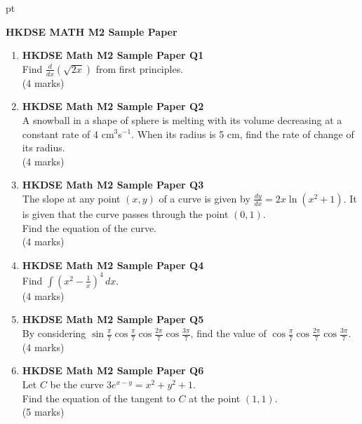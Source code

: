 \documentclass[12pt]{article}
\begin{document}
 pt
\begin{center}
	{\large \bf HKDSE MATH M2 Sample Paper}\\
	\vspace{2 mm}

\end{center}
\vspace{0.05cm}

\begin{enumerate}
	\item \textbf{HKDSE Math M2 Sample Paper Q1}\\
	Find $\displaystyle\frac{d}{dx}(\sqrt{2x})$ from first principles. \\(4 marks)


	\item \textbf{HKDSE Math M2 Sample Paper Q2}\\
	A snowball in a shape of sphere is melting with its volume decreasing at a constant rate of 4 cm$^3$s$^{-1}$. When its radius is 5 cm, find the rate of change of its radius. \\(4 marks)


	\item \textbf{HKDSE Math M2 Sample Paper Q3}\\
	The slope at any point $(x,y)$ of a curve is given by $\displaystyle\frac{dy}{dx} = 2x \ln{(x^2+1)}$. It is given that the curve passes through the point $(0,1)$.\\Find the equation of the curve. \\(4 marks)
		

	\item \textbf{HKDSE Math M2 Sample Paper Q4}\\
	Find $\displaystyle\int\left(x^2-\frac{1}{x}\right)^4 \,dx$. \\(4 marks)


	\item \textbf{HKDSE Math M2 Sample Paper Q5}\\
	By considering $\displaystyle\sin{\frac{\pi}{7}}\cos{\frac{\pi}{7}}\cos{\frac{2\pi}{7}}\cos{\frac{3\pi}{7}}$, find the value of $\displaystyle\cos{\frac{\pi}{7}}\cos{\frac{2\pi}{7}}\cos{\frac{3\pi}{7}}$. \\(4 marks)


	\item \textbf{HKDSE Math M2 Sample Paper Q6}\\
	Let $C$ be the curve $3e^{x-y} = x^2+y^2+1$. \\
	Find the equation of the tangent to $C$ at the point $(1,1)$. \\(5 marks)



\end{enumerate}
\end{document}
